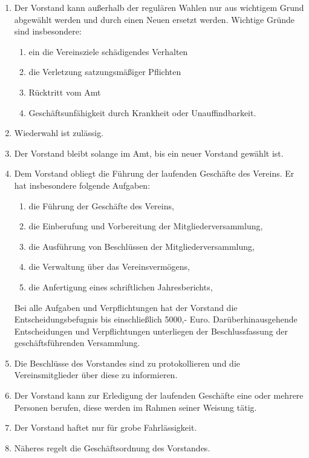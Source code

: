 \documentclass[german]{article}
\begin{document}
\begin{enumerate}
\begin{enumerate}
\item Der Vorstand kann außerhalb der regulären Wahlen nur aus wichtigem Grund abgewählt werden und durch einen Neuen ersetzt werden. Wichtige Gründe sind insbesondere:
\begin{enumerate}
\item ein die Vereinsziele schädigendes Verhalten
\item die Verletzung satzungsmäßiger Pflichten
\item Rücktritt vom Amt
\item Geschäftsunfähigkeit durch Krankheit oder Unauffindbarkeit.
\end{enumerate}
\item Wiederwahl ist zulässig.

\item Der Vorstand bleibt solange im Amt, bis ein neuer Vorstand gewählt ist.

\item Dem Vorstand obliegt die Führung der laufenden Geschäfte des Vereins. Er hat insbesondere folgende Aufgaben:
\begin{enumerate}
\item die Führung der Geschäfte des Vereins,
\item die Einberufung und Vorbereitung der Mitgliederversammlung,
\item die Ausführung von Beschlüssen der Mitgliederversammlung,
\item die Verwaltung über das Vereinsvermögens,
\item die Anfertigung eines schriftlichen Jahresberichts,
\end{enumerate}
Bei alle Aufgaben und Verpflichtungen hat der Vorstand die Entscheidungsbefugnis bis einschließlich 5000,- Euro. Darüberhinausgehende Entscheidungen und Verpflichtungen unterliegen der Beschlussfassung der geschäftsführenden Versammlung.

\item Die Beschlüsse des Vorstandes sind zu protokollieren und die Vereinsmitglieder über diese zu informieren.

\item Der Vorstand kann zur Erledigung der laufenden Geschäfte eine oder mehrere Personen berufen, diese werden im Rahmen seiner Weisung tätig.

\item Der Vorstand haftet nur für grobe Fahrlässigkeit.

\item Näheres regelt die Geschäftsordnung des Vorstandes.


\end{enumerate}
\end{enumerate}
\end{document}
